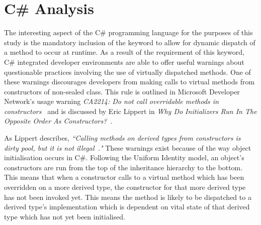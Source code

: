\section{C\# Analysis}
The interesting aspect of the C\# programming language for the purposes of this study is the mandatory inclusion of the  keyword to allow for dynamic dispatch of a method to occur at runtime. As a result of the requirement of this keyword, C\# integrated developer environments are able to offer useful warnings about questionable practices involving the use of virtually dispatched methods. One of these warnings discourages developers from making calls to virtual methods from constructors of non-sealed class. This rule is outlined in Microsoft Developer Network's usage warning \textit{CA2214: Do not call overridable methods in constructors~\cite{OverridableMethodWarning}} and is discussed by Eric Lippert in \textit{Why Do Initializers Run In The Opposite Order As Constructors?~\cite{NoDowncalls}}.
\newline

As Lippert describes, \textit{``Calling methods on derived types from constructors is dirty pool, but it is not illegal~\cite{NoDowncalls}."} These warnings exist because of the way object initialisation occurs in C\#. Following the Uniform Identity model, an object's constructors are run from the top of the inheritance hierarchy to the bottom. This means that when a constructor calls to a virtual method which has been overridden on a more derived type, the constructor for that more derived type has not been invoked yet. This means the method is likely to be dispatched to a derived type's implementation which is dependent on vital state of that derived type which has not yet been initialised.


